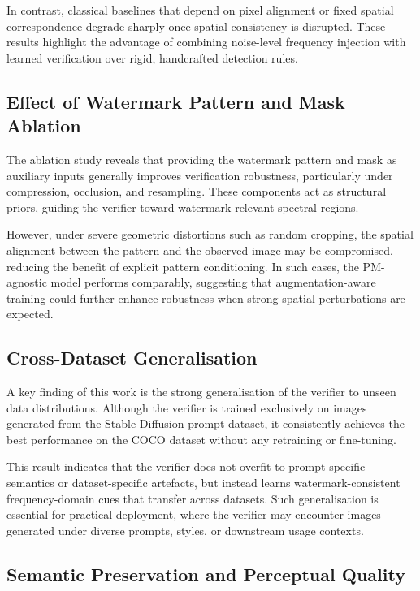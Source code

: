 \documentclass[lettersize,journal,review]{IEEEtran}
\begin{document}
In contrast, classical baselines that depend on pixel alignment or fixed spatial correspondence degrade sharply once spatial consistency is disrupted. These results highlight the advantage of combining noise-level frequency injection with learned verification over rigid, handcrafted detection rules.

\subsection{Effect of Watermark Pattern and Mask Ablation}

The ablation study reveals that providing the watermark pattern and mask as auxiliary inputs generally improves verification robustness, particularly under compression, occlusion, and resampling. These components act as structural priors, guiding the verifier toward watermark-relevant spectral regions.

However, under severe geometric distortions such as random cropping, the spatial alignment between the pattern and the observed image may be compromised, reducing the benefit of explicit pattern conditioning. In such cases, the PM-agnostic model performs comparably, suggesting that augmentation-aware training could further enhance robustness when strong spatial perturbations are expected.

\subsection{Cross-Dataset Generalisation}

A key finding of this work is the strong generalisation of the verifier to unseen data distributions. Although the verifier is trained exclusively on images generated from the Stable Diffusion prompt dataset, it consistently achieves the best performance on the COCO dataset without any retraining or fine-tuning.

This result indicates that the verifier does not overfit to prompt-specific semantics or dataset-specific artefacts, but instead learns watermark-consistent frequency-domain cues that transfer across datasets. Such generalisation is essential for practical deployment, where the verifier may encounter images generated under diverse prompts, styles, or downstream usage contexts.

\subsection{Semantic Preservation and Perceptual Quality}
\end{document}
